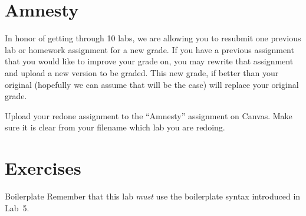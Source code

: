 \documentclass[11pt]{cselabheader}
\begin{document}
\clearpage
\section{Amnesty}
\label{sec:amnesty}
In honor of getting through 10 labs, we are allowing you to resubmit
one previous lab or homework assignment for a new grade. If you have
a previous assignment that you would like to improve your grade on,
you may rewrite that assignment and upload a new version to be graded.
This new grade, if better than your original (hopefully we can assume
that will be the case) will replace your original grade.

Upload your redone assignment to the ``Amnesty'' assignment on Canvas.
Make sure it is clear from your filename which lab you are redoing.

\section{Exercises}
\label{sec:ex}

\begin{warningbox}{Boilerplate}
  Remember that this lab \emph{must} use the
  boilerplate syntax introduced in Lab~5.
\end{warningbox}
\end{document}
